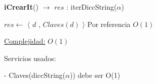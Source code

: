 \begin{Algoritmos}



\begin{algorithm}[H]
{\textbf{iCrearIt}() $\to$ $res$ : iterDiccString($\alpha$)}
\begin{algorithmic}[1]

\State $res \gets$ $\langle$ $d$ , $Claves(d)$ $\rangle$ \Comment Por referencia $O(1)$
 
\medskip
\Statex \underline{Complejidad:} $O(1)$
\end{algorithmic}
\end{algorithm}



  
  
\end{Algoritmos}


Servicios usados:

- Claves(diccString($\alpha$)) debe ser O(1)


